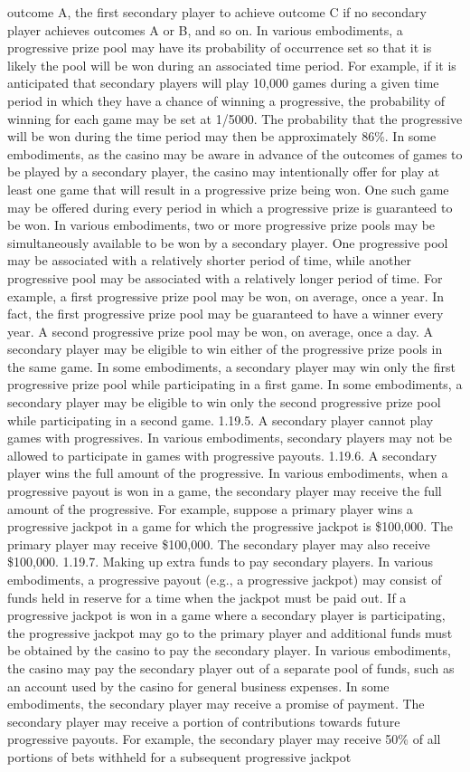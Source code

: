 \documentclass[11pt,a4paper]{article}
\begin{document}
outcome A, the first secondary player to achieve outcome C if no secondary player achieves outcomes A or B, and so on. In various embodiments, a progressive prize pool may have its probability of occurrence set so that it is likely the pool will be won during an associated time period. For example, if it is anticipated that secondary players will play 10,000 games during a given time period in which they have a chance of winning a progressive, the probability of winning for each game may be set at 1/5000. The probability that the progressive will be won during the time period may then be approximately 86\%. In some embodiments, as the casino may be aware in advance of the outcomes of games to be played by a secondary player, the casino may intentionally offer for play at least one game that will result in a progressive prize being won. One such game may be offered during every period in which a progressive prize is guaranteed to be won. In various embodiments, two or more progressive prize pools may be simultaneously available to be won by a secondary player. One progressive pool may be associated with a relatively shorter period of time, while another progressive pool may be associated with a relatively longer period of time. For example, a first progressive prize pool may be won, on average, once a year. In fact, the first progressive prize pool may be guaranteed to have a winner every year. A second progressive prize pool may be won, on average, once a day. A secondary player may be eligible to win either of the progressive prize pools in the same game. In some embodiments, a secondary player may win only the first progressive prize pool while participating in a first game. In some embodiments, a secondary player may be eligible to win only the second progressive prize pool while participating in a second game. 1.19.5. A secondary player cannot play games with progressives. In various embodiments, secondary players may not be allowed to participate in games with progressive payouts. 1.19.6. A secondary player wins the full amount of the progressive. In various embodiments, when a progressive payout is won in a game, the secondary player may receive the full amount of the progressive. For example, suppose a primary player wins a progressive jackpot in a game for which the progressive jackpot is \$100,000. The primary player may receive \$100,000. The secondary player may also receive \$100,000. 1.19.7. Making up extra funds to pay secondary players. In various embodiments, a progressive payout (e.g., a progressive jackpot) may consist of funds held in reserve for a time when the jackpot must be paid out. If a progressive jackpot is won in a game where a secondary player is participating, the progressive jackpot may go to the primary player and additional funds must be obtained by the casino to pay the secondary player. In various embodiments, the casino may pay the secondary player out of a separate pool of funds, such as an account used by the casino for general business expenses. In some embodiments, the secondary player may receive a promise of payment. The secondary player may receive a portion of contributions towards future progressive payouts. For example, the secondary player may receive 50\% of all portions of bets withheld for a subsequent progressive jackpot 
\end{document}
